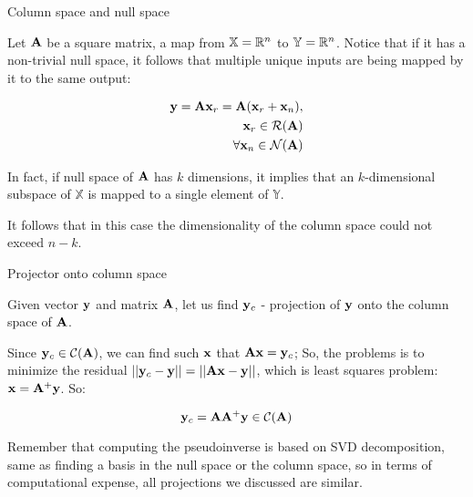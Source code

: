 \documentclass{beamer}
\begin{document}
\begin{frame}{Column space and null space}
	\begin{flushleft}
		
		Let $\mathbf{A}$ be a square matrix, a map from $\mathbb{X} = \mathbb{R}^n$ to $\mathbb{Y} = \mathbb{R}^n$. 
		Notice that if it has a non-trivial null space, it follows that multiple unique inputs are being mapped by it to the same output:
		
		\begin{equation}
			\begin{aligned}
				\mathbf{y} = \mathbf{A} \mathbf{x}_r = \mathbf{A} (\mathbf{x}_r + \mathbf{x}_n), \\
				\mathbf{x}_r \in \mathcal{R}(\mathbf{A}) \\
				\forall \mathbf{x}_n \in \mathcal{N}(\mathbf{A}) \\
			\end{aligned}
		\end{equation}
		
		In fact, if null space of $\mathbf{A}$ has $k$ dimensions, it implies that an $k$-dimensional subspace of $\mathbb{X}$ is mapped to a single element of $\mathbb{Y}$. 
		
		\bigskip
		
		It follows that in this case the dimensionality of the column space could not exceed $n-k$.
		
	\end{flushleft}
\end{frame}



\begin{frame}{Projector onto column space}
	\begin{flushleft}
		
		Given vector $\mathbf{y}$ and matrix $\mathbf{A}$, let us find $\mathbf{y}_c$ - projection of $\mathbf{y}$ onto the column space of $\mathbf{A}$.
		
		\bigskip
		
		Since $\mathbf{y}_c \in \mathcal{C}(\mathbf{A})$, we can find such $\mathbf{x}$ that $\mathbf{A}\mathbf{x} = \mathbf{y}_c$; So, the problems is to minimize the residual $|| \mathbf{y}_c - \mathbf{y} || = || \mathbf{A}\mathbf{x} - \mathbf{y} ||$, which is least squares problem: $\mathbf{x} = \mathbf{A}^+ \mathbf{y}$. So:
		
		\begin{equation}
			\mathbf{y}_c = \mathbf{A}\mathbf{A}^+ \mathbf{y} \in \mathcal{C}(\mathbf{A})
		\end{equation}
		
		Remember that computing the pseudoinverse is based on SVD decomposition, same as finding a basis in the null space or the column space, so in terms of computational expense, all projections we discussed are similar.
		
	\end{flushleft}
\end{frame}
\end{document}
